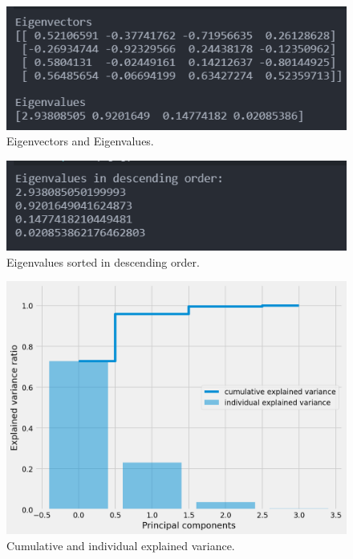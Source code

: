 \documentclass[conference]{IEEEtran}
\begin{document}
\begin{figure}[h]
\centerline{\includegraphics[scale=0.7]{Figures/Eval and Evec.png}}
\caption{Eigenvectors and Eigenvalues.}
\label{fig}
\end{figure}

\begin{figure}[h]
\centerline{\includegraphics[scale=0.7]{Figures/Ev_sorted.png}}
\caption{Eigenvalues sorted in descending order.}
\label{fig}
\end{figure}

\begin{figure}[h]
\centerline{\includegraphics[scale=0.4]{Figures/Variance_exp.png}}
\caption{Cumulative and individual explained variance.}
\label{fig}
\end{figure}
\end{document}
